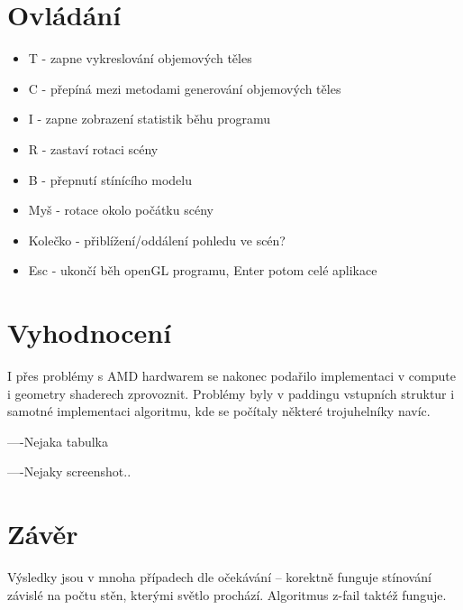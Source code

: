 \documentclass[a4paper, 12pt]{article}
\begin{document}

\section{Ovládání}

\begin{itemize}
	\item T - zapne vykreslování objemových těles
	\item C - přepíná mezi metodami generování objemových těles
	\item I - zapne zobrazení statistik běhu programu
	\item R - zastaví rotaci scény
	\item B - přepnutí stínícího modelu
	\item Myš - rotace okolo počátku scény
	\item Kolečko - přiblížení/oddálení pohledu ve scén?
	\item Esc - ukončí běh openGL programu, Enter potom celé aplikace
\end{itemize}


\section{Vyhodnocení}

I přes problémy s AMD hardwarem se nakonec podařilo implementaci v compute i geometry shaderech zprovoznit.
Problémy byly v paddingu vstupních struktur i samotné implementaci algoritmu, kde se počítaly
některé trojuhelníky navíc. 

----Nejaka tabulka

----Nejaky screenshot..


\section{Závěr}

Výsledky jsou v mnoha případech dle očekávání -- korektně funguje stínování závislé na počtu stěn, kterými světlo prochází. Algoritmus z-fail taktéž funguje.


\begin{flushleft}
  
\end{flushleft}

\end{document}

